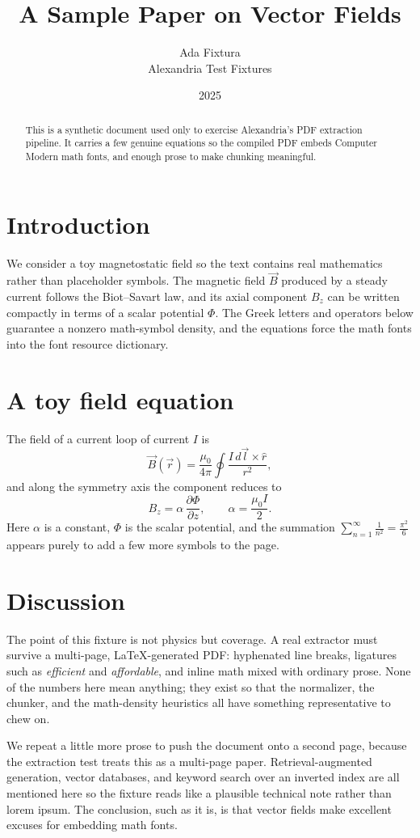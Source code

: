 \documentclass[11pt]{article}
\title{A Sample Paper on Vector Fields}
\author{Ada Fixtura \\ Alexandria Test Fixtures}
\date{2025}
\begin{document}
\maketitle

\begin{abstract}
This is a synthetic document used only to exercise Alexandria's PDF extraction
pipeline. It carries a few genuine equations so the compiled PDF embeds Computer
Modern math fonts, and enough prose to make chunking meaningful.
\end{abstract}

\section{Introduction}

We consider a toy magnetostatic field so the text contains real mathematics
rather than placeholder symbols. The magnetic field $\vec{B}$ produced by a
steady current follows the Biot--Savart law, and its axial component $B_z$ can
be written compactly in terms of a scalar potential $\Phi$. The Greek letters
and operators below guarantee a nonzero math-symbol density, and the equations
force the math fonts into the font resource dictionary.

\section{A toy field equation}

The field of a current loop of current $I$ is
\begin{equation}
\vec{B}(\vec{r}) = \frac{\mu_0}{4\pi} \oint \frac{I\, d\vec{l} \times \hat{r}}{r^2},
\end{equation}
and along the symmetry axis the component reduces to
\begin{equation}
B_z = \alpha\, \frac{\partial \Phi}{\partial z}, \qquad
\alpha = \frac{\mu_0 I}{2}.
\end{equation}
Here $\alpha$ is a constant, $\Phi$ is the scalar potential, and the summation
$\sum_{n=1}^{\infty} \frac{1}{n^2} = \frac{\pi^2}{6}$ appears purely to add a
few more symbols to the page.

\section{Discussion}

The point of this fixture is not physics but coverage. A real extractor must
survive a multi-page, \LaTeX-generated PDF: hyphenated line breaks, ligatures
such as \textit{efficient} and \textit{affordable}, and inline math mixed with
ordinary prose. None of the numbers here mean anything; they exist so that the
normalizer, the chunker, and the math-density heuristics all have something
representative to chew on.

We repeat a little more prose to push the document onto a second page, because
the extraction test treats this as a multi-page paper. Retrieval-augmented
generation, vector databases, and keyword search over an inverted index are all
mentioned here so the fixture reads like a plausible technical note rather than
lorem ipsum. The conclusion, such as it is, is that vector fields make excellent
excuses for embedding math fonts.
\end{document}
